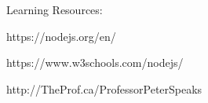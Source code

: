 Learning Resources:

https://nodejs.org/en/

https://www.w3schools.com/nodejs/

http://TheProf.ca/ProfessorPeterSpeaks

